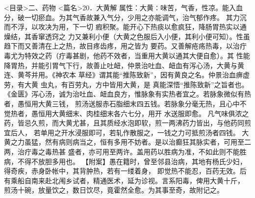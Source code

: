 \documentclass[a4paper,12pt,UTF8,twoside]{ctexbook}
\begin{document}
<目录>二、药物
<篇名>20．大黄解
属性：大黄∶味苦，气香，性凉。能入血分，破一切瘀血。为其气香故兼入气分，少用之亦能调气，治气郁作疼。 
其力沉而不浮，以攻决为用，下一切 瘕积聚。能开心下热痰以愈疯狂，降肠胃热实以通燥结，其香窜透窍之 
力又兼利小便（大黄之色服后入小便，其利小便可知）。性虽趋下而又善清在上之热，故目疼齿疼，用之皆为 
要药。又善解疮疡热毒，以治疔毒尤为特效之药（疔毒甚剧，他药不效者，当重用大黄以通其大便自愈）。其 
性能降胃热，并能引胃气下行，故善止吐衄，仲景治吐血、衄血有泻心汤，大黄与黄连、黄芩并用。《神农本 
草经》谓其能“推陈致新”，因有黄良之名。仲景治血痹虚劳，有大黄 虫丸，有百劳丸，方中皆用大黄，是 
真能深悟“推陈致新”之旨者也。 
《金匮》泻心汤，诚为治吐血、衄血良方，惟脉象有实热者宜之。若脉象微似有热者，愚恒用大黄三钱， 
煎汤送服赤石脂细末四五钱。若脉象分毫无热，且心中不觉热者，愚恒用大黄细末、肉桂细末各六七分，用开 
水送服即愈。 
凡气味俱浓之药，皆忌久煎，而大黄尤甚，且其质经水泡即软，煎一两沸药力皆出，与他药同煎宜后人， 
若单用之开水浸服即可，若轧作散服之，一钱之力可抵煎汤者四钱。 
大黄之力虽猛，然有病则病当之，恒有多用不妨者。是以治癫狂其脉实者，可用至二两，治疔毒之毒热甚 
盛者，亦可用至两许。盖用药以胜病为准，不如此则不能胜病，不得不放胆多用也。 
【附案】愚在籍时，曾至邻县治病，其地有杨氏少妇，得奇疾，赤身卧帐中，其背肿热，若有一缕着身， 
即觉热不能忍，百药无效。后有乘船自南来赴北闱乡试者，精通医术，延为诊视。言系阳毒，俾用大黄十斤， 
煎汤十碗，放量饮之，数日饮尽，竟霍然全愈。为其事至奇，故附记之。 
\end{document}
